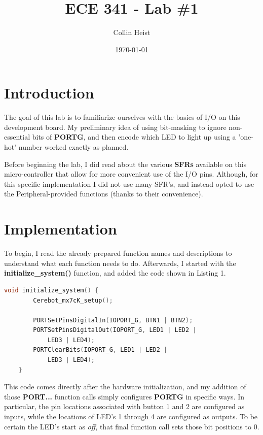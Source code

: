 \documentclass[a4paper, 12pt]{article}
\begin{document}
\title{ECE 341 - Lab \#1}
\author{Collin Heist}
\date{\today}
\maketitle
{}
\tableofcontents
\lstlistoflistings
\newpage
{}

\section{Introduction}
The goal of this lab is to familiarize ourselves with the basics of I/O on this development board. My preliminary idea of using bit-masking to ignore non-essential bits of \textbf{PORTG}, and then encode which LED to light up using a 'one-hot' number worked exactly as planned.

Before beginning the lab, I did read about the various \textbf{SFRs} available on this micro-controller that allow for more convenient use of the I/O pins. Although, for this specific implementation I did not use many SFR's, and instead opted to use the Peripheral-provided functions (thanks to their convenience).

\section{Implementation}
To begin, I read the already prepared function names and descriptions to understand what each function needs to do. Afterwards, I started with the \textbf{initialize\_system()} function, and added the code shown in Listing 1.

	\begin{mdframed}[backgroundcolor=code-gray, roundcorner=10pt,
								innerleftmargin=5, innertopmargin=5, innerbottommargin=5]	
	\begin{lstlisting}[language=C, caption=I/O Pin Initialization, tabsize=2]
	void initialize_system() {
		Cerebot_mx7cK_setup();

		PORTSetPinsDigitalIn(IOPORT_G, BTN1 | BTN2);
		PORTSetPinsDigitalOut(IOPORT_G, LED1 | LED2 |
			LED3 | LED4);
		PORTClearBits(IOPORT_G, LED1 | LED2 |
			LED3 | LED4);
	}
	\end{lstlisting}
	\end{mdframed}
	
This code comes directly after the hardware initialization, and my addition of those \textbf{PORT...} function calls simply configures \textbf{PORTG} in specific ways. In particular, the pin locations associated with button 1 and 2 are configured as inputs, while the locations of LED's 1 through 4 are configured as outputs. To be certain the LED's start as \textit{off}, that final function call sets those bit positions to 0.
\newpage
\end{document}

